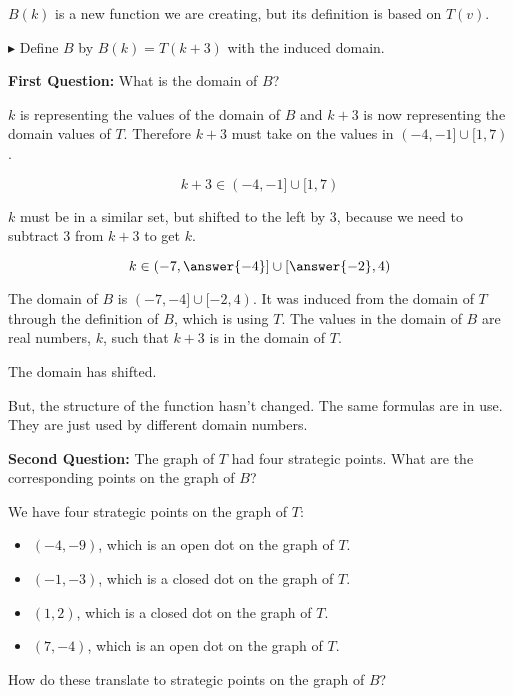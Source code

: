 \documentclass{ximera}
\begin{document}
$B(k)$ is a new function we are creating, but its definition is based on $T(v)$.


$\blacktriangleright$ Define $B$ by $B(k) = T(k+3)$ with the induced domain.


\textbf{\textcolor{purple!85!blue}{First Question:}}   What is the domain of $B$?


\begin{explanation}

$k$ is representing the values of the domain of $B$ and $k+3$ is now representing the domain values of $T$.  Therefore $k+3$ must take on the values in $(-4,-1] \cup [1,7)$.

\[     k+3 \in      (-4,-1] \cup [1,7)     \]


$k$ must be in a similar set, but shifted to the left by $3$, because we need to subtract $3$ from $k+3$ to get $k$.


\[     k \in      \left( -7,\answer{-4} \right] \cup \left[ \answer{-2},4 \right)     \]


The domain of $B$ is $(-7,-4] \cup [-2,4)$.   It was induced from the domain of $T$ through the definition of $B$, which is using $T$.  The values in the domain of $B$ are real numbers, $k$, such that $k+3$ is in the domain of $T$.

The domain has shifted. 


But, the structure of the function hasn't changed.  The same formulas are in use.  They are just used by different domain numbers.
\end{explanation}




\textbf{\textcolor{purple!85!blue}{Second Question:}}  The graph of $T$ had four strategic points.  What are the corresponding points on the graph of $B$?


We have four strategic points on the graph of $T$: 

\begin{itemize}

\item $(-4, -9)$, which is an open dot on the graph of $T$.
\item $(-1, -3)$, which is a closed dot on the graph of $T$.
\item $(1, 2)$, which is a closed dot on the graph of $T$.
\item $(7, -4)$, which is an open dot on the graph of $T$.

\end{itemize}


How do these translate to strategic points on the graph of $B$?
\end{document}

